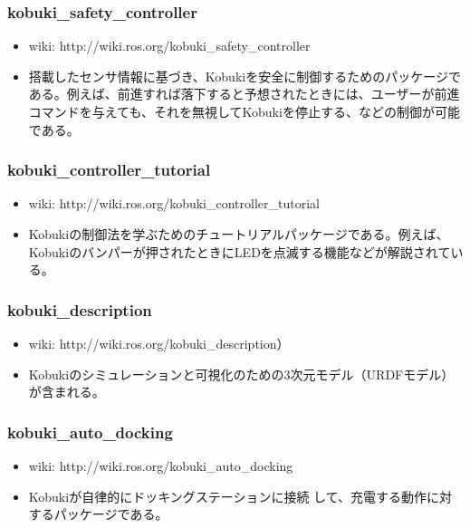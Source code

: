 \subsubsection{kobuki\_safety\_controller}

\begin{itemize}
\item wiki: http://wiki.ros.org/kobuki\_safety\_controller
\item 搭載したセンサ情報に基づき、Kobukiを安全に制御するためのパッケージである。例えば、前進すれば落下すると予想されたときには、ユーザーが前進コマンドを与えても、それを無視してKobukiを停止する、などの制御が可能である。
\end{itemize}

\subsubsection{kobuki\_controller\_tutorial}

\begin{itemize}
\item wiki:  http://wiki.ros.org/kobuki\_controller\_tutorial
\item Kobukiの制御法を学ぶためのチュートリアルパッケージである。例えば、Kobukiのバンパーが押されたときにLEDを点滅する機能などが解説されている。
\end{itemize}

\subsubsection{kobuki\_description}

\begin{itemize}
\item wiki: http://wiki.ros.org/kobuki\_description）
\item Kobukiのシミュレーションと可視化のための3次元モデル（URDFモデル）が含まれる。
\end{itemize}

\subsubsection{kobuki\_auto\_docking}

\begin{itemize}
\item wiki: http://wiki.ros.org/kobuki\_auto\_docking
\item Kobukiが自律的にドッキングステーションに接続  して、充電する動作に対するパッケージである。
\end{itemize}

